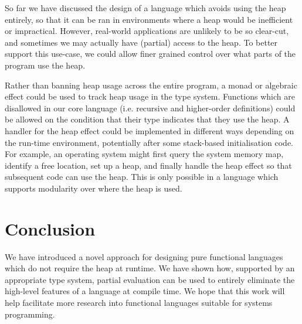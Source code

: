 \documentclass[runningheads]{llncs}
\begin{document}
So far we have discussed the design of a language which avoids using the heap entirely, so that it can be ran in environments where a heap would be inefficient or impractical. However, real-world applications are unlikely to be so clear-cut, and sometimes we may actually have (partial) access to the heap. To better support this use-case, we could allow finer grained control over what parts of the program use the heap.

Rather than banning heap usage across the entire program, a monad or algebraic effect \cite{karachalias2021efficient} could be used to track heap usage in the type system. Functions which are disallowed in our core language (i.e. recursive and higher-order definitions) could be allowed on the condition that their type indicates that they use the heap. A handler for the heap effect could be implemented in different ways depending on the run-time environment, potentially after some stack-based initialisation code. For example, an operating system might first query the system memory map, identify a free location, set up a heap, and finally handle the heap effect so that subsequent code can use the heap. This is only possible in a language which supports modularity over where the heap is used.

\section{Conclusion}

We have introduced a novel approach for designing pure functional languages which do not require the heap at runtime. We have shown how, supported by an appropriate type system, partial evaluation can be used to entirely eliminate the high-level features of a language at compile time. We hope that this work will help facilitate more research into functional languages suitable for systems programming.


\end{document}
